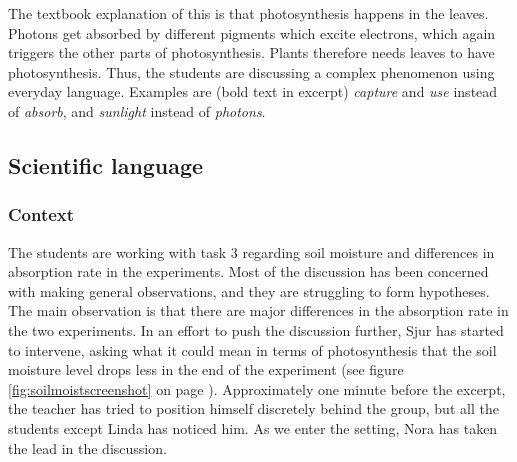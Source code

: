  The textbook explanation of this is that photosynthesis happens in the leaves. Photons get absorbed by different pigments which excite electrons, which again triggers the other parts of photosynthesis. Plants therefore needs leaves to have photosynthesis. Thus, the students are discussing a complex phenomenon using everyday language. Examples are (bold text in excerpt) \textit{capture} and \textit{use} instead of \textit{absorb}, and \textit{sunlight} instead of \textit{photons}. 

\subsection{Scientific language}
\subsubsection*{Context}
The students are working with task 3 regarding soil moisture and differences in absorption rate in the experiments. Most of the discussion has been concerned with making general observations, and they are struggling to form hypotheses. The main observation is that there are major differences in the absorption rate in the two experiments. In an effort to push the discussion further, Sjur has started to intervene, asking what it could mean in terms of photosynthesis that the soil moisture level drops less in the end of the experiment (see figure \ref{fig:soilmoistscreenshot} on page \pageref{fig:soilmoistscreenshot}). Approximately one minute before the excerpt, the teacher has tried to position himself discretely behind the group, but all the students except Linda has noticed him. As we enter the setting, Nora has taken the lead in the discussion.

